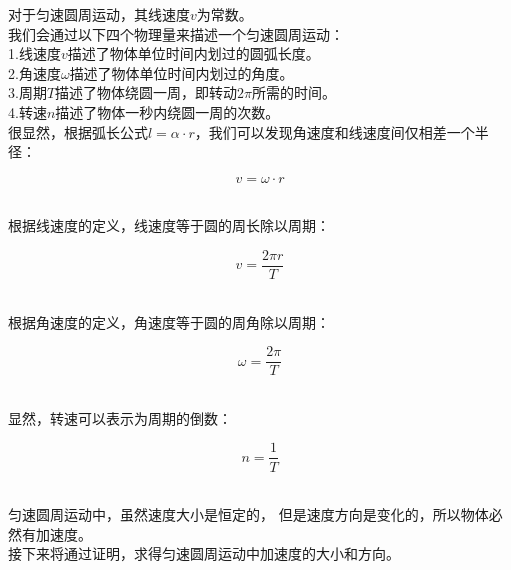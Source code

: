 \documentclass[UTF8]{ctexart}
\begin{document}
    对于匀速圆周运动，其线速度$v$为常数。\\[4mm]
    我们会通过以下四个物理量来描述一个匀速圆周运动：\\[3mm]
    1.线速度$v$描述了物体单位时间内划过的圆弧长度。\\[2mm]
    2.角速度$\omega$描述了物体单位时间内划过的角度。\\[2mm]
    3.周期$T$描述了物体绕圆一周，即转动$2\pi$所需的时间。\\[2mm]
    4.转速$n$描述了物体一秒内绕圆一周的次数。\\[5mm]
    很显然，根据弧长公式$l=\alpha\cdot r$，我们可以发现角速度和线速度间仅相差一个半径：
    \begin{large}
        \begin{equation*}
            v=\omega\cdot r
        \end{equation*}
    \end{large}\\
    根据线速度的定义，线速度等于圆的周长除以周期：\\
    \begin{large}
        \begin{equation*}
            v=\frac{2\pi r}{T}
        \end{equation*}
    \end{large}\\
    根据角速度的定义，角速度等于圆的周角除以周期：\\
    \begin{large}
        \begin{equation*}
            \omega=\frac{2\pi}{T}
        \end{equation*}
    \end{large}\\
    显然，转速可以表示为周期的倒数：\\
    \begin{large}
        \begin{equation*}
            n=\frac{1}{T}
        \end{equation*}
    \end{large}\\[1mm]
    匀速圆周运动中，虽然速度大小是恒定的，
    但是速度方向是变化的，所以物体必然有加速度。\\[3mm]
    接下来将通过证明，求得匀速圆周运动中加速度的大小和方向。

\newpage
\end{document}

